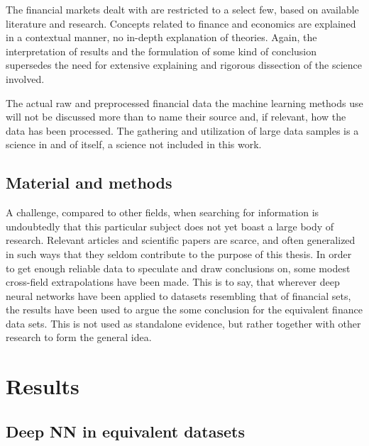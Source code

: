 The financial markets dealt with are restricted to a select few, based on available literature and research. Concepts related to finance and economics are explained in a contextual manner, no in-depth explanation of theories. Again, the interpretation of results and the formulation of some kind of conclusion supersedes the need for extensive explaining and rigorous dissection of the science involved.

The actual raw and preprocessed financial data the machine learning methods use will not be discussed more than to name their source and, if relevant, how the data has been processed. The gathering and utilization of large data samples is a science in and of itself, a science not included in this work.


\subsection{Material and methods}


A challenge, compared to other fields, when searching for information is undoubtedly that this particular subject does not yet boast a large body of research. Relevant articles and scientific papers are scarce, and often generalized in such ways that they seldom contribute to the purpose of this thesis. In order to get enough reliable data to speculate and draw conclusions on, some modest cross-field extrapolations have been made. This is to say, that wherever deep neural networks have been applied to datasets resembling that of financial sets, the results have been used to argue the some conclusion for the equivalent finance data sets. This is not used as standalone evidence, but rather together with other research to form the general idea.


\newpage

\section{Results}
\subsection{Deep NN in equivalent datasets}

